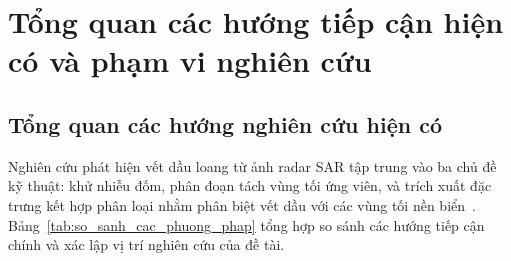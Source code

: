 \section{Tổng quan các hướng tiếp cận hiện có và phạm vi nghiên cứu}
\label{sec:tong_quan_pham_vi}

\subsection{Tổng quan các hướng nghiên cứu hiện có}

Nghiên cứu phát hiện vết dầu loang từ ảnh radar SAR tập trung vào ba chủ đề kỹ thuật: khử nhiễu đốm, phân đoạn tách vùng tối ứng viên, và trích xuất đặc trưng kết hợp phân loại nhằm phân biệt vết dầu với các vùng tối nền biển~\cite{fingas2014review,brekke2005oil}. Bảng~\ref{tab:so_sanh_cac_phuong_phap} tổng hợp so sánh các hướng tiếp cận chính và xác lập vị trí nghiên cứu của đề tài.

